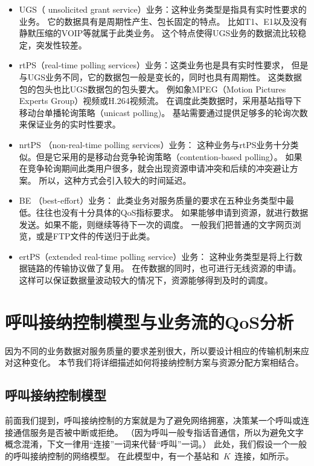 \begin{itemize}
\item UGS（ unsolicited grant service）业务：这种业务类型是指具有实时性要求的业务。
    它的数据具有是周期性产生、包长固定的特点。
    比如T1、E1以及没有静默压缩的VOIP等就属于此类业务。
    这个特点使得UGS业务的数据流比较稳定，突发性较差。
\item rtPS（real-time polling services）业务：这类业务也是具有实时性要求，
    但是与UGS业务不同，它的数据包一般是变长的，同时也具有周期性。
    这类数据包的包头也比UGS数据包的包头要大。
    例如象MPEG（Motion Pictures Experts Group）视频或H.264视频流。
    在调度此类数据时，采用基站指导下移动台单播轮询策略（unicast polling)。
    基站需要通过提供足够多的轮询次数来保证业务的实时性要求。
\item nrtPS （non-real-time polling services）业务：
    这种业务与rtPS业务十分类似。但是它采用的是移动台竞争轮询策略（contention-based polling）。
    如果在竞争轮询期间此类用户很多，就会出现资源申请冲突和后续的冲突避让方案。
    所以，这种方式会引入较大的时间延迟。
\item BE （best-effort）业务：
    此类业务对服务质量的要求在五种业务类型中最低。往往也没有十分具体的QoS指标要求。
    如果能够申请到资源，就进行数据发送。如果不能，则继续等待下一次的调度。
    一般我们把普通的文字网页浏览，或是FTP文件的传送归于此类。
\item ertPS（extended real-time polling service）业务：
    这种业务类型是将上行数据链路的传输协议做了复用。
    在传数据的同时，也可进行无线资源的申请。
    这样可以保证数据量波动较大的情况下，资源能够得到及时的调度。
\end{itemize}

\section{呼叫接纳控制模型与业务流的QoS分析}
\label{sec_qos_metric}
因为不同的业务数据对服务质量的要求差别很大，所以要设计相应的传输机制来应对这种变化。
本节我们将详细描述如何将接纳控制方案与资源分配方案相结合。

\subsection{呼叫接纳控制模型}
\label{sec_sec_model}
前面我们提到，呼叫接纳控制的方案就是为了避免网络拥塞，决策某一个呼叫或连接通信服务是否被中断或拒绝。
（因为呼叫一般专指话音通信，所以为避免文字概念混淆，下文一律用“连接”一词来代替“呼叫”一词。）
此处，我们假设一个一般的呼叫接纳控制的网络模型。
在此模型中，有一个基站和~$K$~连接，如所示。

